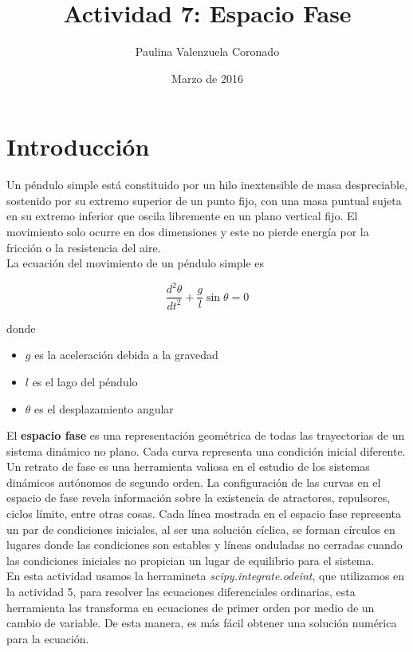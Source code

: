 \documentclass[12pt]{article}
\title{Actividad 7: Espacio Fase}
\author{Paulina Valenzuela Coronado}
\date{Marzo de 2016}
\begin{document}
\maketitle
\section{Introducción}
Un péndulo simple está constituido por un hilo inextensible de masa despreciable, sostenido por su extremo superior de un punto fijo, con una masa puntual sujeta en su extremo inferior que oscila libremente en un plano vertical fijo.
El movimiento solo ocurre en dos dimensiones y este no pierde energía por la fricción o la resistencia del aire.\cite{Wiki} \\

La ecuación del movimiento de un péndulo simple es 

\begin{equation}
	\frac{
		d^2\theta}{dt^2}+\frac{g}{l}\sin\theta=0
\end{equation}

donde
\begin{itemize}
	\item $g$ es la aceleración debida a la gravedad
	\item $l$ es el lago del péndulo
	\item $\theta$ es el desplazamiento angular 
\end{itemize}


El \textbf{espacio fase} es una representación geométrica de todas las trayectorias de un sistema dinámico no plano. Cada curva representa una condición inicial diferente. Un retrato de fase es una herramienta valiosa en el estudio de los sistemas dinámicos autónomos de segundo orden. La configuración de las curvas en el espacio de fase revela información sobre la existencia de atractores, repulsores, ciclos límite, entre otras cosas. Cada línea mostrada en el espacio fase representa un par de condiciones iniciales, al ser una solución cíclica, se forman círculos en lugares donde las condiciones son estables y líneas onduladas no cerradas cuando las condiciones iniciales no propician un lugar de equilibrio para el sistema. \cite{E} \\

En esta actividad usamos la herramineta \textit{scipy.integrate.odeint}, que utilizamos en la actividad 5, para resolver las ecuaciones diferenciales ordinarias, esta herramienta las transforma en ecuaciones de primer orden por medio de un cambio de variable. De esta manera, es más fácil obtener una solución numérica para la ecuación.  \cite{Spicy}
\end{document}
